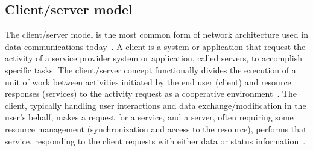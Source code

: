 \subsection{Client/server model}%
\label{sec:client-serv-model}
The client/server model is the most common form of network architecture used
in data communications today~\cite{hanson2000client}. A client is a system or
application that request the activity of a service provider system or
application, called servers, to accomplish specific tasks.
The client/server concept functionally divides the execution of a unit
of work between activities initiated by the end user (client) and resource responses
(services) to the activity request as a cooperative environment~\cite{hanson2000client}. The client,
typically handling user interactions and data exchange/modification in the user’s
behalf, makes a request for a service, and a server, often requiring some resource
management (synchronization and access to the resource), performs that service,
responding to the client requests with either data or status information~\cite{ibmCliServ}.

